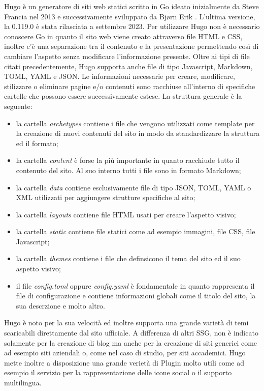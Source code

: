 \documentclass[target=bach,aauheader=]{thud}
\begin{document}
Hugo è un generatore di siti web statici scritto in Go ideato inizialmente da Steve Francia nel 2013 e successivamente sviluppato da Bjørn Erik \cite{hugo-site}. L'ultima versione, la 0.119.0 è stata rilasciata a settembre 2023.
Per utilizzare Hugo non è necessario conoscere Go in quanto il sito web viene creato attraverso file HTML e CSS, inoltre c'è una separazione tra il contenuto e la presentazione permettendo così di cambiare l'aspetto senza modificare l'informazione presente. 
Oltre ai tipi di file citati precedentemente, Hugo supporta anche file di tipo Javascript, Markdown, TOML, YAML e JSON. \newline
Le informazioni necessarie per creare, modificare, stilizzare o eliminare pagine e/o contenuti sono racchiuse all'interno di specifiche cartelle che possono essere successivamente estese. La struttura generale è la seguente:
\begin{itemize}
    \item la cartella \textit{archetypes} contiene i file che vengono utilizzati come template per la creazione di nuovi contenuti del sito in modo da standardizzare la struttura ed il formato;
    \item la cartella \textit{content} è forse la più importante in quanto racchiude tutto il contenuto del sito. Al suo interno tutti i file sono in formato Markdown;
    \item la cartella \textit{data} contiene esclusivamente file di tipo JSON, TOML, YAML o XML utilizzati per aggiungere strutture specifiche al sito;
    \item la cartella \textit{layouts} contiene file HTML usati per creare l'aspetto visivo;
    \item la cartella \textit{static} contiene file statici come ad esempio immagini, file CSS, file Javascript;
    \item la cartella \textit{themes} contiene i file che definsicono il tema del sito ed il suo aspetto visivo;
    \item il file \textit{config.toml} oppure \textit{config.yaml} è fondamentale in quanto rappresenta il file di configurazione e contiene informazioni globali come il titolo del sito, la sua descrzione e molto altro.
\end{itemize}
Hugo è noto per la sua velocità ed inoltre supporta una grande varietà di temi scaricabili direttamente dal sito ufficiale. A differenza di altri SSG, non è indicato solamente per la creazione di blog
ma anche per la creazione di siti generici come ad esempio siti aziendali o, come nel caso di studio, per siti accademici. 
Hugo mette inoltre a disposizione una grande verietà di Plugin molto utili come ad esempio il servizio per la rappresentazione delle icone social o il supporto multilingua. 
\end{document}
